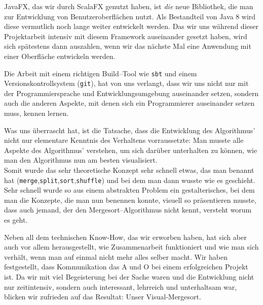 JavaFX, das wir durch ScalaFX genutzt haben, ist \textit{die} neue Bibliothek, die man zur Entwicklung von Benutzeroberflächen nutzt. Als Bestandteil von Java 8 wird diese vermutlich noch lange weiter entwickelt werden. Das wir uns während dieser Projektarbeit intensiv mit diesem Framework auseinander gesetzt haben, wird sich spätestens dann auszahlen, wenn wir das nächste Mal eine Anwendung mit einer Oberfläche entwickeln werden.

Die Arbeit mit einem richtigen Build--Tool wie \texttt{sbt} und einem Versionskontrollsystem (\texttt{git}), hat von uns verlangt, dass wir uns nicht nur mit der Programmiersprache und Entwicklungsumgebung auseinander setzen, sondern auch die anderen Aspekte, mit denen sich ein Programmierer auseinander setzen muss, kennen lernen.

Was uns überrascht hat, ist die Tatsache, dass die Entwicklung des Algorithmus' nicht nur elementare Kenntnis des Verhaltens vorraussetzte: Man musste alle Aspekte des Algorithmus' verstehen, um sich darüber unterhalten zu können, wie man den Algorithmus nun am besten visualisiert.\\
Somit wurde das sehr theoretische Konzept sehr schnell etwas, das man benannt hat (\texttt{merge},\texttt{split},\texttt{sort},\texttt{shuffle}) und bei dem man dann wusste wie es geschieht. Sehr schnell wurde so aus einem abstrakten Problem ein gestalterisches, bei dem man die Konzepte, die man nun benennen konnte, visuell so präsentieren musste, dass auch jemand, der den Mergesort--Algorithmus nicht kennt, versteht worum es geht.

Neben all dem technischen Know-How, das wir erworben haben, hat sich aber auch vor allem herausgestellt, wie Zusammenarbeit funktioniert und wie man sich verhält, wenn man auf einmal nicht mehr alles selber macht. Wir haben festgestellt, dass Kommunikation das A und O bei einem erfolgreichen Projekt ist. Da wir mit viel Begeisterung bei der Sache waren und die Entwicklung nicht nur zeitintensiv, sondern auch interessant, lehrreich und unterhaltsam war, blicken wir zufrieden auf das Resultat: Unser Visual-Mergesort.
